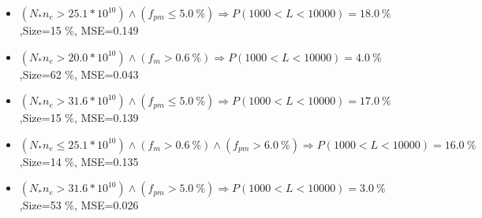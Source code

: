 \documentclass[numbered]{CSL}
\begin{document}
\begin{itemize}
\item $(N_* n_e > 25.1 * 10^{10}) \land (f_{pm} \leq 5.0~\%) \Rightarrow P(1 000 < L < 10 000) = 18.0~\%$,\hfill Size=15 \%, MSE=0.149
\item $(N_* n_e > 20.0 * 10^{10}) \land (f_m > 0.6~\%) \Rightarrow P(1 000 < L < 10 000) = 4.0~\%$,\hfill Size=62 \%, MSE=0.043
\item $(N_* n_e > 31.6 * 10^{10}) \land (f_{pm} \leq 5.0~\%) \Rightarrow P(1 000 < L < 10 000) = 17.0~\%$,\hfill Size=15 \%, MSE=0.139
\item $(N_* n_e \leq 25.1 * 10^{10}) \land (f_m > 0.6~\%) \land (f_{pm} > 6.0~\%) \Rightarrow P(1 000 < L < 10 000) = 16.0~\%$,\hfill Size=14 \%, MSE=0.135
\item $(N_* n_e > 31.6 * 10^{10}) \land (f_{pm} > 5.0~\%) \Rightarrow P(1 000 < L < 10 000) = 3.0~\%$,\hfill Size=53 \%, MSE=0.026
\end{itemize}
\end{document}
